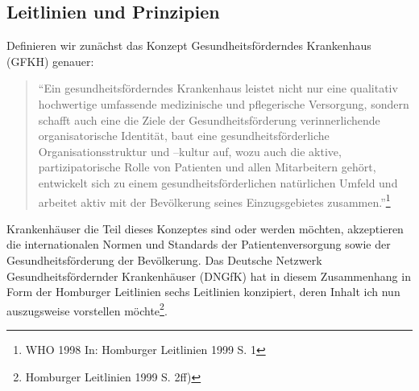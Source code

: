 \subsection{Leitlinien und Prinzipien}
\label{sec:LeitlinienUndPrinzipien}

Definieren wir zunächst das Konzept Gesundheitsförderndes Krankenhaus (GFKH) genauer: 

\begin{quotation}
"`Ein gesundheitsförderndes Krankenhaus leistet nicht nur eine qualitativ hochwertige umfassende medizinische und pflegerische Versorgung, sondern schafft auch eine die Ziele der Gesundheitsförderung verinnerlichende organisatorische Identität, baut eine gesundheitsförderliche Organisationsstruktur und –kultur auf, wozu auch die aktive, partizipatorische Rolle von Patienten und allen Mitarbeitern gehört, entwickelt sich zu einem gesundheitsförderlichen natürlichen Umfeld und arbeitet aktiv mit der Bevölkerung seines Einzugsgebietes zusammen."'\footnote{WHO 1998 In: Homburger Leitlinien 1999 S. 1}
\end{quotation}

Krankenhäuser die Teil dieses Konzeptes sind oder werden möchten, akzeptieren die internationalen Normen und Standards der Patientenversorgung sowie der Gesundheitsförderung der Bevölkerung. Das Deutsche Netzwerk Gesundheitsfördernder Krankenhäuser (DNGfK) hat in diesem Zusammenhang in Form der Homburger Leitlinien sechs Leitlinien konzipiert, deren Inhalt ich nun auszugsweise vorstellen möchte\footnote{Homburger Leitlinien 1999 S. 2ff)}. 

